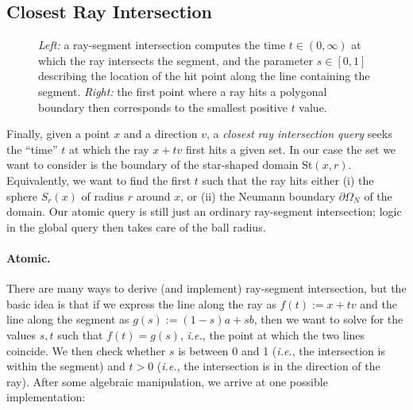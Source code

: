 \documentclass{article}
\newcommand{\ie}{\emph{i.e.}} %
\newcommand{\St}{\text{St}}
\renewcommand{\vec}[1]{#1}
\begin{document}
\subsection{Closest Ray Intersection}
\label{sec:ClosestRayIntersection}

\begin{figure}[h!]
   \centering
   
   
   \label{fig:RayIntersectionExample}
   \caption{\emph{Left:} a ray-segment intersection computes the time \(t \in (0,\infty)\) at which the ray intersects the segment, and the parameter \(s \in [0,1]\) describing the location of the hit point along the line containing the segment. \emph{Right:} the first point where a ray hits a polygonal boundary then corresponds to the smallest positive \(t\) value.}
\end{figure}

Finally, given a point \(\vec{x}\) and a direction \(\vec{v}\), a \emph{closest ray intersection query} seeks the ``time'' \(t\) at which the ray \(\vec{x} + t\vec{v}\) first hits a given set.  In our case the set we want to consider is the boundary of the star-shaped domain \(\St(\vec{x},r)\).  Equivalently, we want to find the first \(t\) such that the ray hits either (i) the sphere \(S_r(\vec{x})\) of radius \(r\) around \(\vec{x}\), or (ii) the Neumann boundary \(\partial\Omega_N\) of the domain.  Our atomic query is still just an ordinary ray-segment intersection; logic in the global query then takes care of the ball radius.

\paragraph{Atomic.} There are many ways to derive (and implement) ray-segment intersection, but the basic idea is that if we express the line along the ray as \(\vec{f}(t) := \vec{x} + t\vec{v}\) and the line along the segment as \(\vec{g}(s) := (1-s)\vec{a} + s\vec{b}\), then we want to solve for the values \(s,t\) such that \(\vec{f}(t) = \vec{g}(s)\), \ie, the point at which the two lines coincide.  We then check whether \(s\) is between 0 and 1 (\ie, the intersection is within the segment) and \(t > 0\) (\ie, the intersection is in the direction of the ray).  After some algebraic manipulation, we arrive at one possible implementation:

\inputminted[fontsize=\small,linenos,firstline=48,lastline=60,bgcolor=bg]{cpp}{../code/WoStLaplace2D.cpp}
\end{document}
